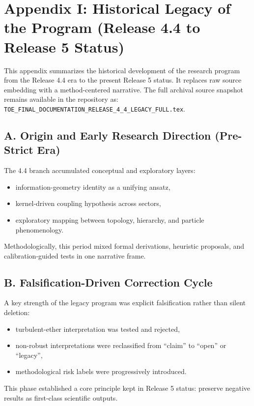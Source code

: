 \documentclass[11pt,a4paper]{article}
\begin{document}
\section{Appendix I: Historical Legacy of the Program (Release 4.4 to Release 5 Status)}
\label{sec:appendix_i_legacy_44}

This appendix summarizes the historical development of the research program from the Release 4.4 era to the present Release 5 status. It replaces raw source embedding with a method-centered narrative. The full archival source snapshot remains available in the repository as:
\texttt{TOE\_FINAL\_DOCUMENTATION\_RELEASE\_4\_4\_LEGACY\_FULL.tex}.

\subsection{A. Origin and Early Research Direction (Pre-Strict Era)}
The 4.4 branch accumulated conceptual and exploratory layers:
\begin{itemize}[leftmargin=1.4em]
    \item information-geometry identity as a unifying ansatz,
    \item kernel-driven coupling hypothesis across sectors,
    \item exploratory mapping between topology, hierarchy, and particle phenomenology.
\end{itemize}
Methodologically, this period mixed formal derivations, heuristic proposals, and calibration-guided tests in one narrative frame.

\subsection{B. Falsification-Driven Correction Cycle}
A key strength of the legacy program was explicit falsification rather than silent deletion:
\begin{itemize}[leftmargin=1.4em]
    \item turbulent-ether interpretation was tested and rejected,
    \item non-robust interpretations were reclassified from ``claim'' to ``open'' or ``legacy'',
    \item methodological risk labels were progressively introduced.
\end{itemize}
This phase established a core principle kept in Release 5 status: preserve negative results as first-class scientific outputs.
\end{document}
